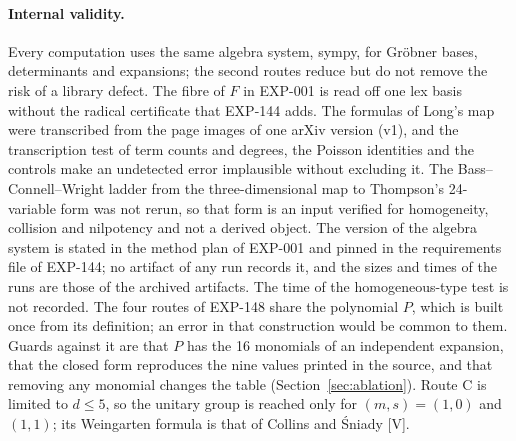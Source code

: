 \documentclass[11pt]{article}
\theoremstyle{remark}
\newcommand{\EXP}[1]{\mbox{EXP-#1}}
\begin{document}
\paragraph{Internal validity.} Every computation uses the same algebra system, sympy, for Gr\"obner bases, determinants and expansions; the second routes reduce but do not remove the risk of a library defect. The fibre of $F$ in \EXP{001} is read off one lex basis without the radical certificate that \EXP{144} adds. The formulas of Long's map were transcribed from the page images of one arXiv version (v1), and the transcription test of term counts and degrees, the Poisson identities and the controls make an undetected error implausible without excluding it. The Bass--Connell--Wright ladder from the three-dimensional map to Thompson's 24-variable form was not rerun, so that form is an input verified for homogeneity, collision and nilpotency and not a derived object. The version of the algebra system is stated in the method plan of \EXP{001} and pinned in the requirements file of \EXP{144}; no artifact of any run records it, and the sizes and times of the runs are those of the archived artifacts. The time of the homogeneous-type test is not recorded. The four routes of \EXP{148} share the polynomial $P$, which is built once from its definition; an error in that construction would be common to them. Guards against it are that $P$ has the 16 monomials of an independent expansion, that the closed form reproduces the nine values printed in the source, and that removing any monomial changes the table (Section~\ref{sec:ablation}). Route C is limited to $d\le5$, so the unitary group is reached only for $(m,s)=(1,0)$ and $(1,1)$; its Weingarten formula is that of Collins and \'Sniady \cite{CollinsSniady2006} [V].
\end{document}
